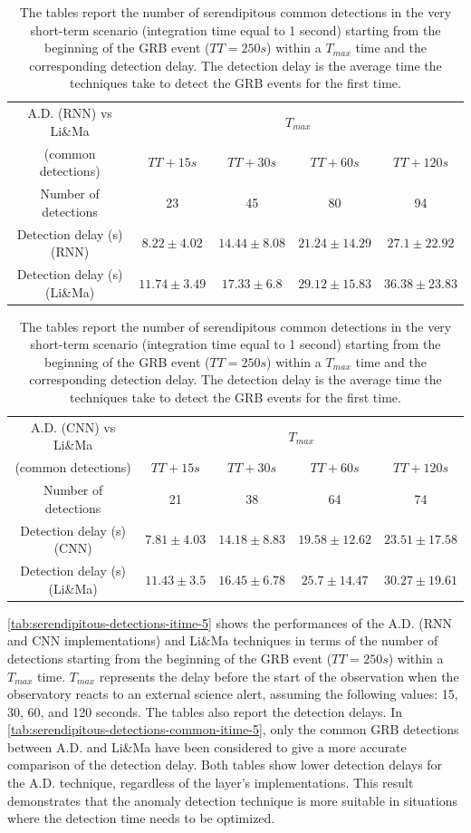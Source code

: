 \begin{table} %
\begin{tabular}{|c|cccc|}  
\hline
\multicolumn{1}{|c|}{A.D. (RNN) vs Li\&Ma} & \multicolumn{4}{c|}{$T_{max}$}  \\
(common detections) & $TT+15s$ & $TT+30s$ &  $TT+60s$ & $TT+120s$        \\
\hline
Number of detections & 23 & 45 & 80 & 94 \\
\hline
Detection delay (s) (RNN)& $8.22 \pm 4.02$ & $14.44 \pm 8.08 $ & $21.24 \pm 14.29$ & $ 27.1 \pm 22.92$ \\
\hline
Detection delay (s) (Li\&Ma)& $11.74 \pm 3.49$ & $17.33 \pm 6.8$ & $29.12 \pm 15.83$  & $36.38 \pm 23.83$   \\
\hline
\end{tabular}
\vspace{1em}
\begin{tabular}{|c|cccc|}
\hline
\multicolumn{1}{|c|}{A.D. (CNN) vs Li\&Ma} & \multicolumn{4}{c|}{$T_{max}$}  \\
(common detections) & $TT+15s$ & $TT+30s$ &  $TT+60s$ & $TT+120s$        \\
\hline
Number of detections & 21 & 38 & 64 & 74           \\
\hline
Detection delay (s) (CNN) & $7.81 \pm 4.03$ & $14.18 \pm 8.83$  & $19.58 \pm 12.62$  & $23.51 \pm 17.58$  \\
\hline
Detection delay (s) (Li\&Ma)& $11.43 \pm 3.5$ & $16.45 \pm 6.78$ & $25.7 \pm 14.47$  & $30.27 \pm 19.61$   \\
\hline
\end{tabular}
\caption{The tables report the number of serendipitous common detections in the very short-term scenario (integration time equal to 1 second) starting from the beginning of the GRB event ($TT=250s$) within a $T_{max}$ time and the corresponding detection delay. The detection delay is the average time the techniques take to detect the GRB events for the first time.}
\label{tab:serendipitous-detections-common-itime-1}
\end{table}
\autoref{tab:serendipitous-detections-itime-5} shows the performances of the A.D. (RNN and CNN implementations) and Li\&Ma techniques in terms of the number of detections starting from the beginning of the GRB event ($TT = 250s$)  within a $T_{max}$ time. $T_{max}$ represents the delay before the start of the observation when the observatory reacts to an external science alert, assuming the following values: 15, 30, 60, and 120 seconds. The tables also report the detection delays. In \autoref{tab:serendipitous-detections-common-itime-5}, only the common GRB detections between A.D. and Li\&Ma have been considered to give a more accurate comparison of the detection delay. Both tables show lower detection delays for the A.D. technique, regardless of the layer's implementations. This result demonstrates that the anomaly detection technique is more suitable in situations where the detection time needs to be optimized.
